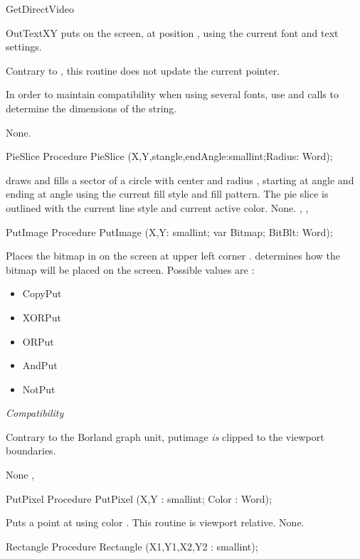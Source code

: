 \begin{function}{GetDirectVideo}
\begin{procedure}{OutTextXY}
\Description
{} puts  on the screen, at position ,
using the current font and text settings.

Contrary to  , this routine does not update the current pointer.

In order to maintain compatibility when using several fonts, use 
and  calls to determine the dimensions of the string.

\Errors
None.
\SeeAlso
{}
\end{procedure}
\begin{procedure}{PieSlice}
\Declaration
Procedure PieSlice (X,Y,stangle,endAngle:smallint;Radius: Word);

\Description
{}
draws and fills a sector of a circle with center  and radius
, starting at angle  and ending at angle 
using the current fill style and fill pattern. The pie slice is outlined
with the current line style and current active color.
\Errors
None.
\SeeAlso
{}, , 
\end{procedure}
\begin{procedure}{PutImage}
\Declaration
Procedure PutImage (X,Y: smallint; var Bitmap; BitBlt: Word);

\Description
{}
Places the bitmap in  on the screen at upper left
corner .  determines how the bitmap
will be placed on the screen. Possible values are :
\begin{itemize}
\item CopyPut
\item XORPut
\item ORPut
\item AndPut
\item NotPut
\end{itemize}

\textit{Compatibility}

Contrary to the Borland graph unit, putimage \textit{is} clipped to the
viewport boundaries.

\Errors
None
\SeeAlso
{},
\end{procedure}
\begin{procedure}{PutPixel}
\Declaration
Procedure PutPixel (X,Y : smallint; Color : Word);

\Description
Puts a point at
 using color . This routine is viewport
relative.
\Errors
None.
\SeeAlso
{}
\end{procedure}
\begin{procedure}{Rectangle}
\Declaration
Procedure Rectangle (X1,Y1,X2,Y2 : smallint);


\end{procedure}
\end{function}
